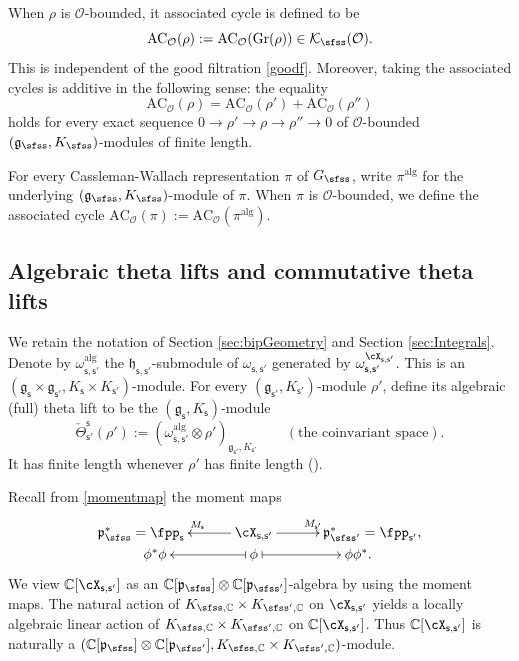 \documentclass[11pt,a4paper]{amsart}
\newcommand{\CK}{{\mathcal {K}}}
\newcommand{\CO}{{\mathcal {O}}}
\newcommand{\oS}{\operatorname{S}}
\newcommand{\g}{\mathfrak g}
\newcommand{\h}{\mathfrak h}
\newcommand{\p}{\mathfrak p}
\numberwithin{equation}{section}
\theoremstyle{remark}
\begin{document}
When $\rho$ is  $\CO$-bounded, it associated cycle is defined to be
\[
   \mathrm{AC}_\CO(\rho):= \mathrm{AC}_\CO(\mathrm{Gr}(\rho))\in  \CK_\sfss(\CO).
\]
This is independent of the good filtration \eqref{goodf}. Moreover, taking the associated cycles is additive in the following sense: the equality
\[
 \mathrm{AC}_\CO(\rho)= \mathrm{AC}_\CO(\rho')+ \mathrm{AC}_\CO(\rho'')
\]
holds for every exact sequence
$0\rightarrow \rho'\rightarrow \rho\rightarrow \rho''\rightarrow 0$ of  $\CO$-bounded  $(\g_\sfss, K_{\sfss})$-modules of finite length.

For every Cassleman-Wallach representation $\pi$ of $G_\sfss$, write $\pi^{\mathrm{alg}}$ for the underlying $(\g_\sfss, K_\sfss)$-module of $\pi$. When $\pi$ is $\CO$-bounded, we define the associated cycle $\mathrm{AC}_\CO(\pi):=\mathrm{AC}_\CO(\pi^{\mathrm{alg}})$.

\subsection{Algebraic theta lifts and commutative theta lifts}


We retain the notation of Section \ref{sec:bipGeometry} and Section \ref{sec:Integrals}.
Denote by $\omega^{\mathrm{alg}}_{\mathsf s, \mathsf s'}$ the $\h_{\mathsf s, \mathsf s'}$-submodule of $\omega_{\mathsf s, \mathsf s'}$ generated by  $ \omega_{\mathsf s, \mathsf s'}^{\cX_{\mathsf s, \mathsf s'}}$. This is an $(\g_\mathsf s\times \g_{\mathsf s'}, K_\mathsf s\times K_{\mathsf s'})$-module. For every $ (\g_{\mathsf s'}, K_{\mathsf s'})$-module $\rho'$, define its algebraic (full) theta lift to be the $(\g_{\mathsf s}, K_{\mathsf s})$-module
\[
   \check \Theta_{\mathsf s'}^{\mathsf s}(\rho'):=(\omega^{\mathrm{alg}}_{\mathsf s, \mathsf s'}\otimes \rho')_{\g_{\mathsf s'}, K_{\mathsf s'}} \qquad (\textrm{the  coinvariant space}).
\]
It has finite length whenever $\rho'$ has finite length (\cite[Section 4]{Howe89}).



Recall from \eqref{momentmap} the moment maps
  \[
    \xymatrix@R=0em@C=3.0em{
     \p_\sfss^*=\fpp_\mathsf s &\ar[l]_{M_\mathsf s} \cX_{\mathsf s, \mathsf s'}\ar[r]^{M_{\mathsf s'}}& \p_{\sfss'}^*=\fpp_{\mathsf s'},\\
    \qquad \phi^* \phi  &\ar@{|->}[l] \phi \ar@{|->}[r] & \phi \phi^*.\qquad
    }
  \]
We view $\C[\cX_{\mathsf s, \mathsf s'}]$ as an $\C[\p_\sfss]\otimes \C[\p_{\sfss'}]$-algebra by using the moment maps. The natural action of $K_{\sfss,\C}\times K_{\sfss',\C}$ on $\cX_{\mathsf s, \mathsf s'}$ yields a locally algebraic linear action of  $K_{\sfss,\C}\times K_{\sfss',\C}$ on $\C[\cX_{\mathsf s, \mathsf s'}]$. Thus $\C[\cX_{\mathsf s, \mathsf s'}]$  is naturally a  $(\C[\p_{\sfss}]\otimes \C[\p_{\sfss'}], K_{\sfss, \C}\times K_{\sfss', \C})$-module.
\end{document}

